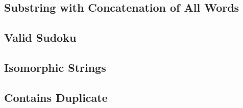     
\subsection{Substring with Concatenation of All Words}

\subsection{Valid Sudoku}

\subsection{Isomorphic Strings}

\subsection{Contains Duplicate}

